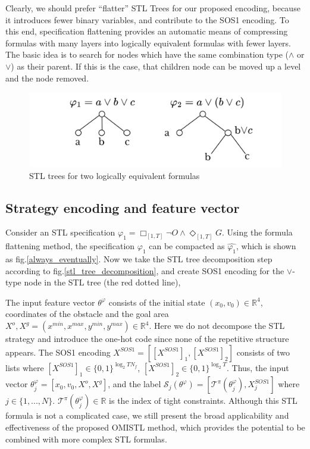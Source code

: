 \documentclass[a4paper]{report}
\begin{document}
Clearly, we should prefer “flatter” STL Trees for our proposed encoding, because it introduces fewer binary variables, and contribute to the SOS1 encoding. To this end, specification flattening provides an automatic means of compressing formulas with many layers into logically equivalent formulas with fewer layers. The basic idea is to search for nodes which have the same combination type ($\wedge$ or $\vee$) as their parent. If this is the case, that children node can be moved up a level and the node removed.
\begin{figure}[htbp] \centering 
    \vspace{0.5cm}
    \centering
    \includegraphics[scale=0.7]{flatten.png}
    \vspace{-0.4cm}
    \caption{STL trees for two logically equivalent formulas}
    \label{flatten}
    \vspace{-0.6cm}
\end{figure} 
\vspace{-0.2cm}

\subsection{Strategy encoding and feature vector}

Consider an STL specification $\varphi_1=\Box_{[1,T]}\lnot O\wedge \Diamond_{[1,T]}G$. Using the formula flattening method, the specification $\varphi_1$ can be compacted as $\hat{\varphi_1}$, which is shown as fig.\ref{always_eventually}. Now we take the STL tree decomposition step according to fig.\ref{stl_tree_decomposition}, and create SOS1 encoding for the $\vee$-type node in the STL tree (the red dotted line), 

The input feature vector $\theta^\varphi $ consists of the initial state $(x_0,v_0) \in \mathbb{R}^4$, coordinates of the obstacle and the goal area $X^o,X^g=(x^{min},x^{max},y^{min},y^{max}) \in \mathbb{R}^4$. Here we do not decompose the STL strategy and introduce the one-hot code since none of the repetitive structure appears. The SOS1 encoding $X^{SOS1}= [[X^{SOS1}]_1, [X^{SOS1}]_2]$ consists of two lists where $[X^{SOS1}]_1 \in \{0,1\}^{\log_2TN_f}$, $[X^{SOS1}]_2 \in \{0,1\}^{\log_2T}$. Thus, the input vector $\theta_{j}^{\varphi} = [x_0,v_0,X^o,X^g]$, and the label $\mathcal{S}_{j}(\theta^{\varphi})= [\mathcal{T}^{\pi}(\theta_{j}^{\varphi}), X_{j}^{SOS1}]$ where $j \in\{1,...,N\}$. $\mathcal{T}^{\pi}(\theta_{j}^{\varphi})\in \mathbb{R}$ is the index of tight constraints. Although this STL formula is not a complicated case, we still present the broad applicability and effectiveness of the proposed OMISTL method, which provides the potential to be combined with more complex STL formulas.
\end{document}
